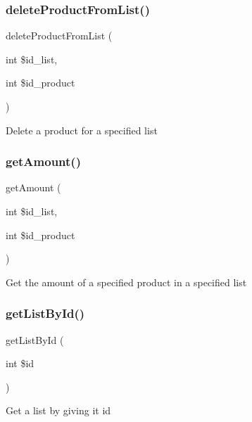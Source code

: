 \subsubsection{\texorpdfstring{delete\+Product\+From\+List()}{deleteProductFromList()}}
{\footnotesize\ttfamily delete\+Product\+From\+List (\begin{DoxyParamCaption}\item[{int}]{\$id\+\_\+list,  }\item[{int}]{\$id\+\_\+product }\end{DoxyParamCaption})}

Delete a product for a specified list \mbox{\label{class_shopping_list__model_a1c91e4d37b6cc18d9ffca1e9718213bb}} 
\subsubsection{\texorpdfstring{get\+Amount()}{getAmount()}}
{\footnotesize\ttfamily get\+Amount (\begin{DoxyParamCaption}\item[{int}]{\$id\+\_\+list,  }\item[{int}]{\$id\+\_\+product }\end{DoxyParamCaption})}

Get the amount of a specified product in a specified list \mbox{\label{class_shopping_list__model_a5e244bd766fe003179871105026b35fa}} 
\subsubsection{\texorpdfstring{get\+List\+By\+Id()}{getListById()}}
{\footnotesize\ttfamily get\+List\+By\+Id (\begin{DoxyParamCaption}\item[{int}]{\$id }\end{DoxyParamCaption})}

Get a list by giving it id \mbox{\label{class_shopping_list__model_a1e37654033d0e20491d3171e4c8a1aee}} 
